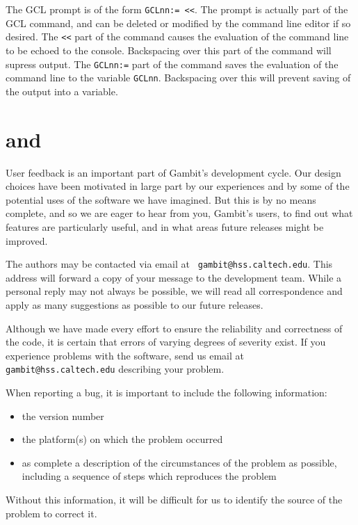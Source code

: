 The GCL prompt is of the form \verb+GCLnn:= <<+.  The prompt is
actually part of the GCL command, and can be deleted or modified by
the command line editor if so desired.  The \verb+<<+ part of the
command causes the evaluation of the command line to be echoed to the
console. Backspacing over this part of the command will supress
output.  The \verb+GCLnn:=+ part of the command saves the evaluation
of the command line to the variable \verb+GCLnn+.  Backspacing over
this will prevent saving of the output into a variable.

\section{ and }

User feedback is an important part of Gambit's development cycle.  Our
design choices have been motivated in large part by our experiences
and by some of the potential uses of the software we have imagined.
But this is by no means complete, and so we are eager to hear from
you, Gambit's users, to find out what features are particularly
useful, and in what areas future releases might be improved.

The authors may be contacted via email at {\tt
gambit@hss.caltech.edu}.  This address will forward a copy of your
message to the development team.  While a personal reply may not
always be possible, we will read all correspondence and apply as many
suggestions as possible to our future releases.

Although we have made every effort to ensure the reliability and
correctness of the code, it is certain that errors of varying degrees
of severity exist.   If you experience problems with the software,
send us email at {\tt gambit@hss.caltech.edu} describing your problem.

When reporting a bug, it is important to include the following
information:

\begin{itemize}
\item the version number
\item the platform(s) on which the problem occurred
\item as complete a description of the circumstances of the problem as
possible, including a sequence of steps which reproduces the problem
\end{itemize}
 
\noindent 
Without this information, it will be difficult for us to
identify the source of the problem to correct it.

